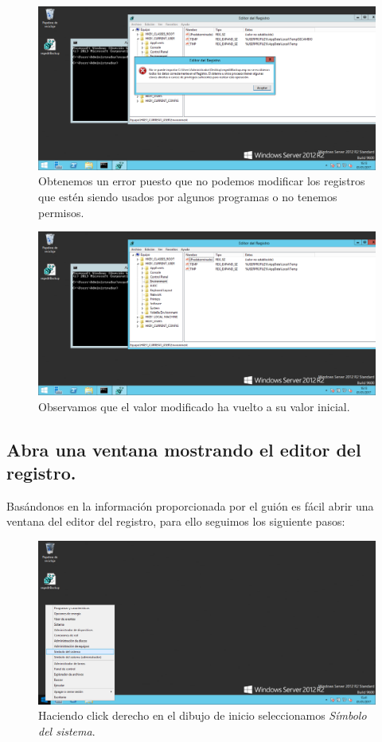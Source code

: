 \begin{figure}[H]
	\centering
	\includegraphics[scale=0.4]{regedit7.png}
	\caption{Obtenemos un error puesto que no podemos modificar los registros que estén siendo usados por algunos programas o no tenemos permisos.}
\end{figure}

\begin{figure}[H]
	\centering
	\includegraphics[scale=0.4]{regedit8.png}
	\caption{Observamos que el valor modificado ha vuelto a su valor inicial.}
\end{figure}
\subsection{Abra una ventana mostrando el editor del registro.}
Basándonos en la información proporcionada por el guión es fácil abrir una ventana del editor del registro, para ello seguimos los siguiente pasos:

\begin{figure}[H]
	\centering
	\includegraphics[scale=0.4]{openregedit1.png}
	\caption{Haciendo click derecho en el dibujo de inicio seleccionamos \textit{Símbolo del sistema}.}
\end{figure}


